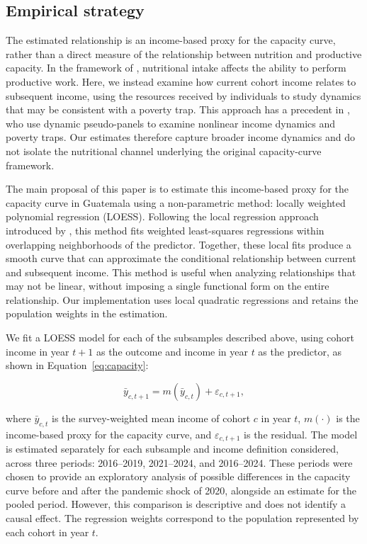 \documentclass{article}
\begin{document}
\subsection{Empirical strategy}

The estimated relationship is an income-based proxy for the capacity curve, rather than a direct measure of the relationship between nutrition and productive capacity. In the framework of \textcite{dasgupta1986}, nutritional intake affects the ability to perform productive work. Here, we instead examine how current cohort income relates to subsequent income, using the resources received by individuals to study dynamics that may be consistent with a poverty trap. This approach has a precedent in \textcite{antman2007}, who use dynamic pseudo-panels to examine nonlinear income dynamics and poverty traps. Our estimates therefore capture broader income dynamics and do not isolate the nutritional channel underlying the original capacity-curve framework.

The main proposal of this paper is to estimate this income-based proxy for the capacity curve in Guatemala using a non-parametric method: locally weighted polynomial regression (LOESS). Following the local regression approach introduced by \textcite{cleveland1979}, this method fits weighted least-squares regressions within overlapping neighborhoods of the predictor. Together, these local fits produce a smooth curve that can approximate the conditional relationship between current and subsequent income. This method is useful when analyzing relationships that may not be linear, without imposing a single functional form on the entire relationship. Our implementation uses local quadratic regressions and retains the population weights in the estimation.

We fit a LOESS model for each of the subsamples described above, using cohort income in year $t+1$ as the outcome and income in year $t$ as the predictor, as shown in Equation~\ref{eq:capacity}:

\begin{equation}
    \bar{y}_{c,t+1}
    =
    m(\bar{y}_{c,t})+\varepsilon_{c,t+1},
    \label{eq:capacity}
\end{equation}

where $\bar{y}_{c,t}$ is the survey-weighted mean income of cohort $c$ in year $t$, $m(\cdot)$ is the income-based proxy for the capacity curve, and $\varepsilon_{c,t+1}$ is the residual. The model is estimated separately for each subsample and income definition considered, across three periods: 2016--2019, 2021--2024, and 2016--2024. These periods were chosen to provide an exploratory analysis of possible differences in the capacity curve before and after the pandemic shock of 2020, alongside an estimate for the pooled period. However, this comparison is descriptive and does not identify a causal effect. The regression weights correspond to the population represented by each cohort in year $t$.
\end{document}
